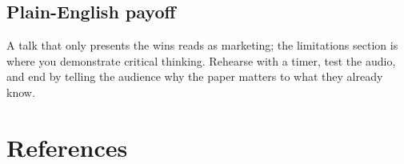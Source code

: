 \documentclass[11pt]{article}
\theoremstyle{remark}
\begin{document}
\subsection*{Plain-English payoff}

A talk that only presents the wins reads as marketing; the limitations section is where you demonstrate critical thinking. Rehearse with a timer, test the audio, and end by telling the audience why the paper matters to what they already know.

\section*{References}
\end{document}
